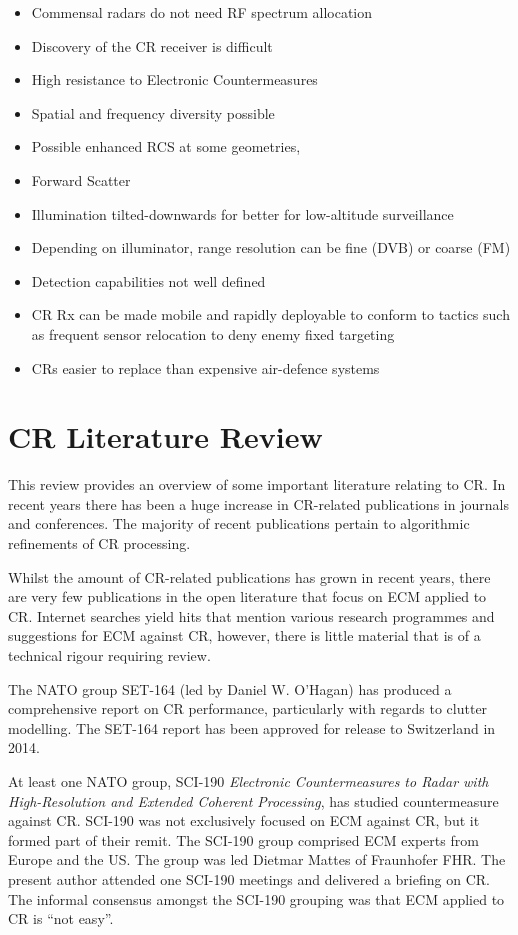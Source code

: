 \begin{itemize}
\item Commensal radars do not need RF spectrum allocation
\item Discovery of the CR receiver is difficult
\item High resistance to Electronic Countermeasures
\item Spatial and frequency diversity possible
\item Possible enhanced RCS at some geometries,
\item Forward Scatter
\item Illumination tilted-downwards for better for low-altitude surveillance
\item Depending on illuminator, range resolution can be fine (DVB) or coarse (FM)
\item Detection capabilities not well defined
\item CR Rx can be made mobile and rapidly deployable to conform to tactics such as frequent sensor relocation to deny enemy fixed targeting
\item CRs easier to replace than expensive air-defence systems


\end{itemize}


\section{CR Literature Review}

This review provides an overview of some important literature relating to CR. In recent years there has been a huge increase in CR-related publications in journals and conferences. The majority of recent publications pertain to algorithmic refinements of CR processing. 

Whilst the amount of CR-related publications has grown in recent years, there are very few publications in the open literature that focus on ECM applied to CR. Internet searches yield hits that mention various research programmes and suggestions for ECM against CR, however, there is little material that is of a technical rigour requiring review.

The NATO group SET-164 (led by Daniel W. O'Hagan) has produced a comprehensive report on CR performance, particularly with regards to clutter modelling. The SET-164 report has been approved for release to Switzerland in 2014.

At least one NATO group, SCI-190 \textit{Electronic Countermeasures to Radar with High-Resolution and Extended Coherent Processing}, has studied countermeasure against CR. SCI-190 was not exclusively focused on ECM against CR, but it formed part of their remit. The SCI-190 group comprised ECM experts from Europe and the US. The group was led Dietmar Mattes of Fraunhofer FHR. The present author attended one SCI-190 meetings and delivered a briefing on CR. The informal consensus amongst the SCI-190 grouping was that ECM applied to CR is ``not easy''.

